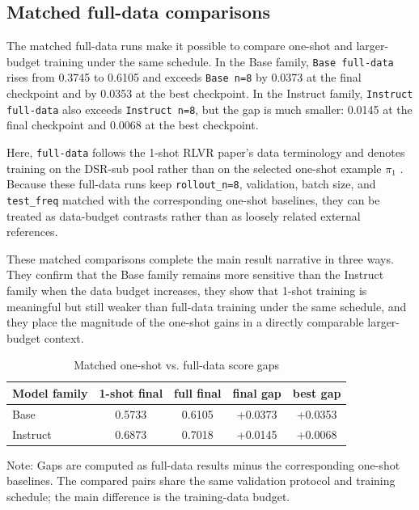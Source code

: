 \documentclass[12pt,a4paper]{ctexart}
\begin{document}
\subsection{Matched full-data comparisons}

The matched full-data runs make it possible to compare one-shot and larger-budget training under the same schedule. In the Base family, \texttt{Base full-data} rises from 0.3745 to 0.6105 and exceeds \texttt{Base n=8} by 0.0373 at the final checkpoint and by 0.0353 at the best checkpoint. In the Instruct family, \texttt{Instruct full-data} also exceeds \texttt{Instruct n=8}, but the gap is much smaller: 0.0145 at the final checkpoint and 0.0068 at the best checkpoint.

Here, \texttt{full-data} follows the 1-shot RLVR paper's data terminology and denotes training on the DSR-sub pool rather than on the selected one-shot example \(\pi_1\) \cite{wang2025oneshotrlvr,deepscaler2025}. Because these full-data runs keep \texttt{rollout\_n=8}, validation, batch size, and \texttt{test\_freq} matched with the corresponding one-shot baselines, they can be treated as data-budget contrasts rather than as loosely related external references.

These matched comparisons complete the main result narrative in three ways. They confirm that the Base family remains more sensitive than the Instruct family when the data budget increases, they show that 1-shot training is meaningful but still weaker than full-data training under the same schedule, and they place the magnitude of the one-shot gains in a directly comparable larger-budget context.

\begin{table}[H]
    \centering
    \caption{Matched one-shot vs. full-data score gaps}
    \label{tab:en-full-ceiling-reference}
    \small
    \begin{threeparttable}
    \begin{tabular}{lcccc}
        \toprule
        Model family & 1-shot final & full final & final gap & best gap \\
        \midrule
        Base & 0.5733 & 0.6105 & +0.0373 & +0.0353 \\
        Instruct & 0.6873 & 0.7018 & +0.0145 & +0.0068 \\
        \bottomrule
    \end{tabular}
    \begin{tablenotes}[flushleft]
        \footnotesize
        \item Note: Gaps are computed as full-data results minus the corresponding one-shot baselines. The compared pairs share the same validation protocol and training schedule; the main difference is the training-data budget.
    \end{tablenotes}
    \end{threeparttable}
\end{table}
\end{document}

